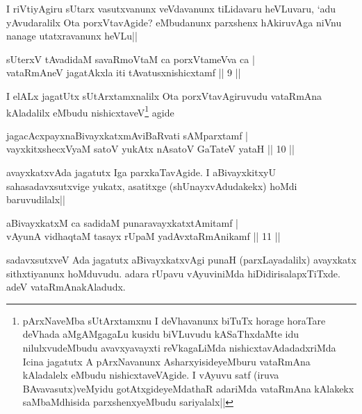 \begin{artha}
I riVtiyAgiru sUtarx vasutxvanunx veVdavanunx tiLidavaru heVLuvaru, `adu yAvudaralilx Ota porxVtavAgide? eMbudanunx parxshenx hAkiruvAga niVnu nanage utatxravanunx heVLu||
\end{artha}


\begin{shl}
sUterxV tAvadidaM savaRmoVtaM ca porxVtameVva ca |\\
vataRmAneV jagatAkxla iti tAvatusxnishicxtamf \hfill || 9 ||
\end{shl}

\begin{artha}
I elALx jagatUtx sUtArxtamxnalilx Ota porxVtavAgiruvudu vataRmAna kAladalilx eMbudu nishicxtaveV\footnote[1]{pArxNaveMba sUtArxtamxnu I deVhavanunx biTuTx horage horaTare deVhada aMgAMgagaLu kusidu biVLuvudu kASaThxdaMte idu nilulxvudeMbudu avavxyavayxti reVkagaLiMda nishicxtavAdadadxriMda Icina jagatutx A pArxNavanunx AsharxyisideyeMburu vataRmAna kAladalelx eMbudu nishicxtaveVAgide. I vAyuvu satf (iruva BAvavasutx)veMyidu gotAtxgideyeMdathaR adariMda vataRmAna kAlakekx saMbaMdhisida parxshenxyeMbudu sariyalalx||} agide
\end{artha}

\begin{shl}
jagacAcxpayxnaBivayxkatxmAviBaRvati sAMparxtamf |\\
vayxkitxshecxVyaM satoV yukAtx nAsatoV GaTateV yataH \hfill || 10 ||
\end{shl}

\begin{artha}%
avayxkatxvAda jagatutx Iga parxkaTavAgide. I aBivayxkitxyU sahasadavxsutxvige yukatx, asatitxge (shUnayxvAdudakekx) hoMdi baruvudilalx||
\end{artha}

\begin{shl}
aBivayxkatxM ca sadidaM punaravayxkatxtAmitamf |\\
vAyunA vidhaqtaM tasayx rUpaM yadAvxtaRmAnikamf \hfill || 11 ||
\end{shl}

\begin{artha}
sadavxsutxveV Ada jagatutx aBivayxkatxvAgi punaH (parxLayadalilx) avayxkatx sithxtiyanunx hoMduvudu. adara rUpavu vAyuviniMda hiDidirisalapxTiTxde. adeV vataRmAnakAladudx. 
\end{artha}

